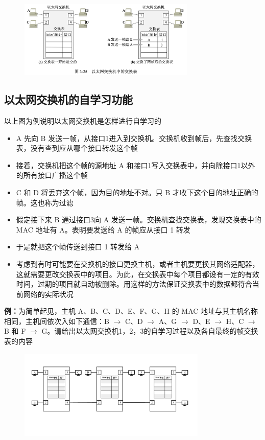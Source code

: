\documentclass[cs4size,a4paper,10pt]{ctexart}
\begin{document}
	\begin{figure}[H]
		\centering
		\includegraphics[width=0.75\textwidth]{img/3.25}
	\end{figure}

	\subsection{以太网交换机的自学习功能}
	以上图为例说明以太网交换机是怎样进行自学习的
	\begin{itemize}
		\item A 先向 B 发送一帧，从接口1进入到交换机。交换机收到帧后，先查找交换表，没有查到应从哪个接口转发这个帧
		\item 接着，交换机把这个帧的源地址 A 和接口1写入交换表中，并向除接口1以外的所有接口广播这个帧
		\item C 和 D 将丢弃这个帧，因为目的地址不对。只 B 才收下这个目的地址正确的帧。这也称为过滤
		\item 假定接下来 B 通过接口3向 A 发送一帧。交换机查找交换表，发现交换表中的 MAC 地址有 A。表明要发送给 A 的帧应从接口 1 转发
		\item 于是就把这个帧传送到接口 1 转发给 A
		\item 考虑到有时可能要在交换机的接口更换主机，或者主机要更换其网络适配器，这就需要更改交换表中的项目。为此，在交换表中每个项目都设有一定的有效时间，过期的项目就自动被删除。用这样的方法保证交换表中的数据都符合当前网络的实际状况
	\end{itemize}

	\textbf{例：}为简单起见，主机 A、B、C、D、E、F、G、H 的 MAC 地址与其主机名称相同，主机间依次入如下通信：B $\rightarrow$ C、D $\rightarrow$ A、G $\rightarrow$ D、E $\rightarrow$ H、C $\rightarrow$ B 和 F $\rightarrow$ G。请给出以太网交换机1，2，3的自学习过程以及各自最终的帧交换表的内容

	\begin{figure}[H]
		\centering
		\includegraphics[width=0.8\textwidth]{img/3.5.2.2.1}
	\end{figure}
\end{document}

